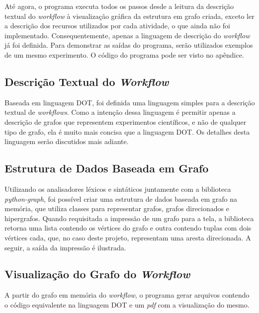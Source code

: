 \documentclass[a4paper,11pt]{article}
\begin{document}
  	Até agora, o programa executa todos os passos desde a leitura da descrição textual do \emph{workflow} à visualização gráfica da estrutura em grafo criada, exceto ler a descrição dos recursos utilizados por cada atividade, o que ainda não foi implementado. Consequentemente, apenas a linguagem de descrição do \emph{workflow} já foi definida. Para demonstrar as saídas do programa, serão utilizados exemplos de um mesmo experimento. O código do programa pode ser visto no apêndice.

  	\subsection{Descrição Textual do \emph{Workflow}}
  		Baseada em linguagem DOT, foi definida uma linguagem simples para a descrição textual de \emph{workflows}. Como a intenção dessa linguagem é permitir apenas a descrição de grafos que representem experimentos científicos, e não de qualquer tipo de grafo, ela é muito mais concisa que a linguagem DOT. Os detalhes desta linguagem serão discutidos mais adiante.

	  	
	  	

	\subsection{Estrutura de Dados Baseada em Grafo}
		Utilizando os analisadores léxicos e sintáticos juntamente com a biblioteca \emph{python-graph}, foi possível criar uma estrutura de dados baseada em grafo na memória, que utiliza classes para representar grafos, grafos direcionados e hipergrafos. Quando requisitada a impressão de um grafo para a tela, a biblioteca retorna uma lista contendo os vértices do grafo e outra contendo tuplas com dois vértices cada, que, no caso deste projeto, representam uma aresta direcionada. A seguir, a saída da impressão é ilustrada.

		

	\newpage
	\subsection{Visualização do Grafo do \emph{Workflow}}

		A partir do grafo em memória do \emph{workflow}, o programa gerar arquivos contendo o código equivalente na linguagem DOT e um \emph{pdf} com a visualização do mesmo.\\
\end{document}
